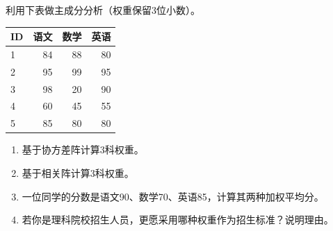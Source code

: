 \par\addvspace{6pt}\noindent\begin{minipage}{\linewidth}


利用下表做主成分分析（权重保留3位小数）。

\begin{center}\small\setlength{\tabcolsep}{4pt}\renewcommand{\arraystretch}{1.18}\begin{tabular}{@{}lrrr@{}}
\toprule
ID & 语文 & 数学 & 英语 \\
\midrule

1 & 84 & 88 & 80 \\
2 & 95 & 99 & 95 \\
3 & 98 & 20 & 90 \\
4 & 60 & 45 & 55 \\
5 & 85 & 80 & 80 \\
\bottomrule\end{tabular}\end{center}

\begin{enumerate}
\def\labelenumi{\arabic{enumi}.}
\tightlist
\item
  基于协方差阵计算3科权重。
\item
  基于相关阵计算3科权重。
\item
  一位同学的分数是语文90、数学70、英语85，计算其两种加权平均分。
\item
  若你是理科院校招生人员，更愿采用哪种权重作为招生标准？说明理由。
\end{enumerate}




\end{minipage}\par\vspace{4pt}

